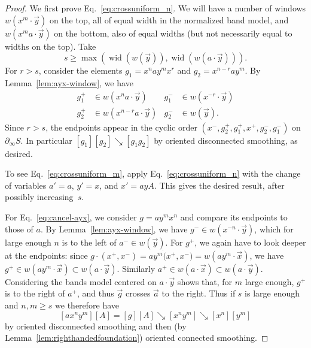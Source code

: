 \documentclass[11pt]{amsart}
\newcommand{\ora}[1]{\overrightarrow{#1}}
\numberwithin{equation}{section}
\numberwithin{figure}{section}
\theoremstyle{definition}
\theoremstyle{plain}
\newcommand{\wid}{\operatorname{wid}}
\newcommand{\reducesto}{\mathrel{\searrow}}
\begin{document}
\begin{proof}
  We first prove Eq.~\eqref{eq:crossuniform_n}. We will have a number
  of windows $w(x^m \cdot \ora{y})$ on the top, all of equal width
  in the normalized band model, and $w(x^m a \cdot \ora{y})$ on the
  bottom, also of equal widths (but not necessarily equal to widths on
  the top). Take
  \[
    s \ge \max(\wid(w(\ora{y})),
    \wid(w(a\cdot\ora{y}))).
  \]
  For $r > s$, consider the elements $g_1 = x^n ay^m x^r$ and $g_2 =
  x^{n-r} a y^m$. By Lemma~\ref{lem:ayx-window}, we have
  \begin{align*}
    g_1^+ &\in w(x^n a\cdot\ora{y}) & g_1^- &\in w(x^{-r}\cdot\ora{y})\\
    g_2^+ &\in w(x^{n-r} a \cdot\ora{y}) & g_2^- &\in w(\ora{y}).
  \end{align*}
  Since $r>s$, the endpoints appear in the cyclic order
  $(x^-,g_2^+,g_1^+,x^+,g_2^-,g_1^-)$ on $\partial_\infty S$. In
  particular $[g_1][g_2] \reducesto [g_1 g_2]$ by oriented disconnected smoothing, as desired.
  
  To see Eq.~\eqref{eq:crossuniform_m}, apply
  Eq.~\eqref{eq:crossuniform_n} with the change of variables
  $a' = a$, $y' = x$, and $x' = ayA$.
  This gives the desired result, after possibly increasing~$s$.

  For Eq.~\eqref{eq:cancel-ayx}, we consider $g = a y ^m x^n$ and
  compare its endpoints to those of $a$. By
  Lemma~\ref{lem:ayx-window}, we have
  $g^- \in w(x^{-n} \cdot \ora{y})$, which for large enough $n$ is to
  the left of $a^- \in w(\ora{y})$. For $g^+$,
  we again have to look deeper at the endpoints: since
  $g \cdot (x^+,x^-) = a y^m \dot (x^+, x^-) = w(a y^m \cdot
  \ora{x})$, we have
  $g^+ \in w(a y^m \cdot \ora{x}) \subset w(a \cdot \ora{y})$.
  Similarly $a^+ \in w(a \cdot \ora{x}) \subset w(a \cdot \ora{y})$.
  Considering the bands model centered on $a \cdot \ora{y}$ shows that,
  for $m$ large enough, $g^+$ is to the right of $a^+$, and thus
  $\ora{g}$ crosses $\ora{a}$ to the right. Thus if $s$ is large
  enough and $n,m
  \ge s$ we therefore have
  \[
    [a x^n y^m][A] = [g][A] \reducesto [x^n y^m] \reducesto [x^n][y^m]
  \]
  by oriented disconnected smoothing and then (by
  Lemma~\ref{lem:righthandedfoundation}) oriented connected
  smoothing.


\end{proof}
\end{document}
